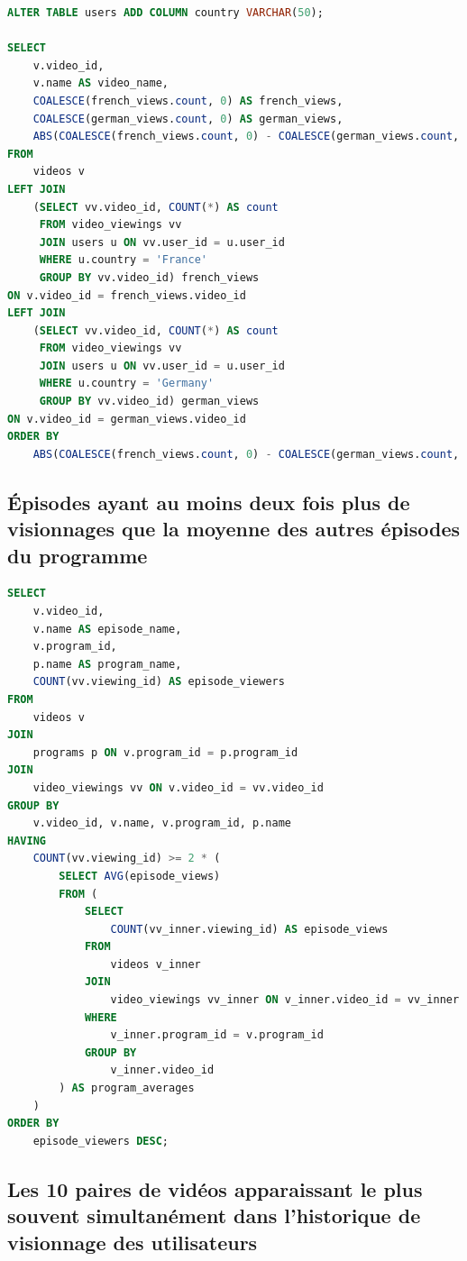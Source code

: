 \documentclass{article}
\begin{document}
\begin{lstlisting}[language=SQL]
ALTER TABLE users ADD COLUMN country VARCHAR(50);

SELECT 
    v.video_id,
    v.name AS video_name,
    COALESCE(french_views.count, 0) AS french_views,
    COALESCE(german_views.count, 0) AS german_views,
    ABS(COALESCE(french_views.count, 0) - COALESCE(german_views.count, 0)) AS view_difference
FROM 
    videos v
LEFT JOIN 
    (SELECT vv.video_id, COUNT(*) AS count
     FROM video_viewings vv
     JOIN users u ON vv.user_id = u.user_id
     WHERE u.country = 'France'
     GROUP BY vv.video_id) french_views 
ON v.video_id = french_views.video_id
LEFT JOIN 
    (SELECT vv.video_id, COUNT(*) AS count
     FROM video_viewings vv
     JOIN users u ON vv.user_id = u.user_id
     WHERE u.country = 'Germany'
     GROUP BY vv.video_id) german_views 
ON v.video_id = german_views.video_id
ORDER BY 
    ABS(COALESCE(french_views.count, 0) - COALESCE(german_views.count, 0)) DESC;
\end{lstlisting}

\subsection{Épisodes ayant au moins deux fois plus de visionnages que la moyenne des autres épisodes du programme}

\begin{lstlisting}[language=SQL]
SELECT 
    v.video_id,
    v.name AS episode_name,
    v.program_id,
    p.name AS program_name,
    COUNT(vv.viewing_id) AS episode_viewers
FROM 
    videos v
JOIN 
    programs p ON v.program_id = p.program_id
JOIN 
    video_viewings vv ON v.video_id = vv.video_id
GROUP BY 
    v.video_id, v.name, v.program_id, p.name
HAVING 
    COUNT(vv.viewing_id) >= 2 * (
        SELECT AVG(episode_views)
        FROM (
            SELECT 
                COUNT(vv_inner.viewing_id) AS episode_views
            FROM 
                videos v_inner
            JOIN 
                video_viewings vv_inner ON v_inner.video_id = vv_inner.video_id
            WHERE 
                v_inner.program_id = v.program_id
            GROUP BY 
                v_inner.video_id
        ) AS program_averages
    )
ORDER BY 
    episode_viewers DESC;
\end{lstlisting}

\subsection{Les 10 paires de vidéos apparaissant le plus souvent simultanément dans l'historique de visionnage des utilisateurs}
\end{document}
